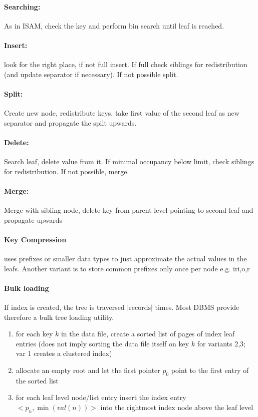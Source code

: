 \documentclass[a4paper]{article}
\begin{document}
\begin{twocolumn}
\paragraph{Searching:} As in ISAM, check the key and perform bin search until leaf is reached. \\

\paragraph{Insert:} look for the right place, if not full insert. If full check siblings for redistribution (and update separator if necessary). If not possible split. \\

\paragraph{Split:} Create new node, redistribute keys, take first value of the second leaf as new separator and propagate the spilt upwards. \\

\paragraph{Delete:} Search leaf, delete value from it. If minimal occupancy below limit, check siblings for redistribution. If not possible, merge. \\

\paragraph{Merge:} Merge with sibling node, delete key from parent level pointing to second leaf and propagate upwards

\paragraph{Key Compression} uses prefixes or smaller data types to just approximate the actual values in the leafs. Another variant is to store common prefixes only once per node e.g. iri,o,r \\

\paragraph{Bulk loading} If index is created, the tree is traversed $|\text{records}|$ times. Most DBMS provide therefore a bulk tree loading utility.
\begin{enumerate}
	\item for each key $k$ in the data file, create a sorted list of pages of index leaf entries (does not imply sorting the data file itself on key $k$ for variants 2,3; var 1 creates a clustered index)
	\item allocate an empty root and let the first pointer $p_0$ point to the first entry of the sorted list
	\item for each leaf level node/list entry insert the index entry $<p_n, \min(val(n))>$ into the rightmost index node above the leaf level
\end{enumerate}


\end{twocolumn}
\end{document}
